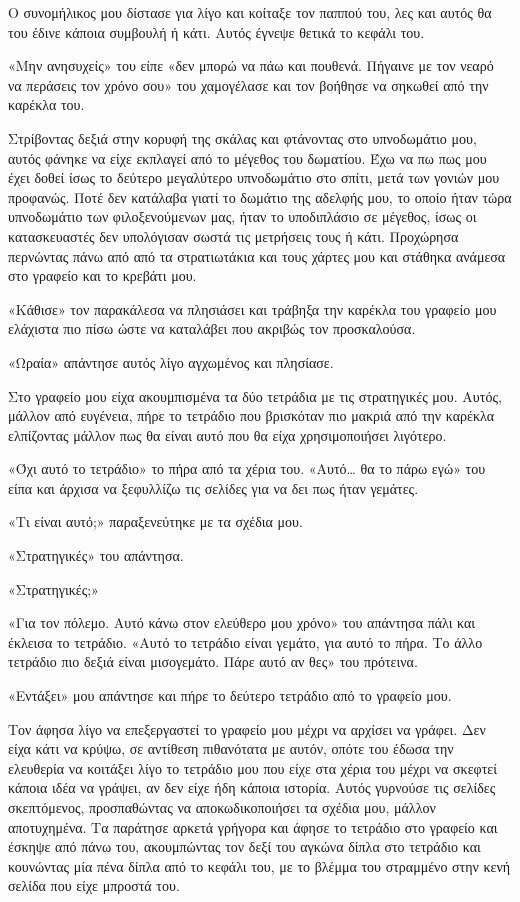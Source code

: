 \documentclass[12pt,twoside, openany]{book}
\begin{document}
Ο συνομήλικος μου δίστασε για λίγο και κοίταξε τον παππού του, λες και αυτός θα του έδινε κάποια συμβουλή ή κάτι. Αυτός έγνεψε θετικά το κεφάλι του.

«Μην ανησυχείς» του είπε «δεν μπορώ να πάω και πουθενά. Πήγαινε με τον νεαρό να περάσεις τον χρόνο σου» του χαμογέλασε και τον βοήθησε να σηκωθεί από την καρέκλα του.

Στρίβοντας δεξιά στην κορυφή της σκάλας και φτάνοντας στο υπνοδωμάτιο μου, αυτός φάνηκε να είχε εκπλαγεί από το μέγεθος του δωματίου. Έχω να πω πως μου έχει δοθεί ίσως το δεύτερο μεγαλύτερο υπνοδωμάτιο στο σπίτι, μετά των γονιών μου προφανώς. Ποτέ δεν κατάλαβα γιατί το δωμάτιο της αδελφής μου, το οποίο ήταν τώρα υπνοδωμάτιο των φιλοξενούμενων μας, ήταν το υποδιπλάσιο σε μέγεθος, ίσως οι κατασκευαστές δεν υπολόγισαν σωστά τις μετρήσεις τους ή κάτι. Προχώρησα περνώντας πάνω από από τα στρατιωτάκια και τους χάρτες μου και στάθηκα ανάμεσα στο γραφείο και το κρεβάτι μου.

«Κάθισε» τον παρακάλεσα να πλησιάσει και τράβηξα την καρέκλα του γραφείο μου ελάχιστα πιο πίσω ώστε να καταλάβει που ακριβώς τον προσκαλούσα.

«Ωραία» απάντησε αυτός λίγο αγχωμένος και πλησίασε.

Στο γραφείο μου είχα ακουμπισμένα τα δύο τετράδια με τις στρατηγικές μου. Αυτός, μάλλον από ευγένεια, πήρε το τετράδιο που βρισκόταν πιο μακριά από την καρέκλα ελπίζοντας μάλλον πως θα είναι αυτό που θα είχα χρησιμοποιήσει λιγότερο.

«Όχι αυτό το τετράδιο» το πήρα από τα χέρια του. «Αυτό… θα το πάρω εγώ» του είπα και άρχισα να ξεφυλλίζω τις σελίδες για να δει πως ήταν γεμάτες.

«Τι είναι αυτό;» παραξενεύτηκε με τα σχέδια μου.

«Στρατηγικές» του απάντησα.

«Στρατηγικές;»

«Για τον πόλεμο. Αυτό κάνω στον ελεύθερο μου χρόνο» του απάντησα πάλι και έκλεισα το τετράδιο. «Αυτό το τετράδιο είναι γεμάτο, για αυτό το πήρα. Το άλλο τετράδιο πιο δεξιά είναι μισογεμάτο. Πάρε αυτό αν θες» του πρότεινα.

«Εντάξει» μου απάντησε και πήρε το δεύτερο τετράδιο από το γραφείο μου.

Τον άφησα λίγο να επεξεργαστεί το γραφείο μου μέχρι να αρχίσει να γράφει. Δεν είχα κάτι να κρύψω, σε αντίθεση πιθανότατα με αυτόν, οπότε του έδωσα την ελευθερία να κοιτάξει λίγο το τετράδιο μου που είχε στα χέρια του μέχρι να σκεφτεί κάποια ιδέα να γράψει, αν δεν είχε ήδη κάποια ιστορία. Αυτός γυρνούσε τις σελίδες σκεπτόμενος, προσπαθώντας να αποκωδικοποιήσει τα σχέδια μου, μάλλον αποτυχημένα. Τα παράτησε αρκετά γρήγορα και άφησε το τετράδιο στο γραφείο και έσκηψε από πάνω του, ακουμπώντας τον δεξί του αγκώνα δίπλα στο τετράδιο και κουνώντας μία πένα δίπλα από το κεφάλι του, με το βλέμμα του στραμμένο στην κενή σελίδα που είχε μπροστά του.
\end{document}
